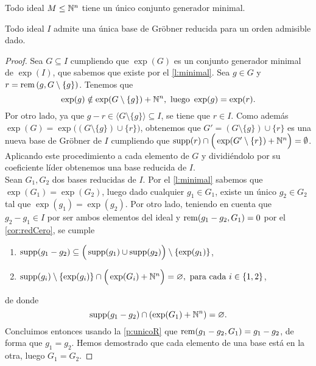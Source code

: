 \begin{lema}\label{l:minimal}
    Todo ideal $M\le \mathbb{N}^n$ tiene un único conjunto generador minimal.
\end{lema}




\begin{teorema}\label{t:reduce}
    Todo ideal $I$ admite una única base de Gröbner reducida para un orden admisible dado.
\end{teorema}
\begin{proof}
     Sea $G\subseteq I$ cumpliendo que $\exp(G)$ es un conjunto generador minimal de $\exp(I)$, que sabemos que existe por el \autoref{l:minimal}. Sea $g\in G$ y $r = \operatorname{rem}\left(g, G\setminus \{g\}\right)$. Tenemos que
    \begin{equation*}
        \exp(g) \notin \exp(G\setminus\{g\}) + \mathbb{N}^n, \text{ luego } \exp(g)=\exp(r).
    \end{equation*}
    Por otro lado, ya que $g-r\in \langle G\setminus \{g\}\rangle \subseteq I$, se tiene que $r\in I$. Como además $\exp(G) = \exp\Big( (G\setminus \{g\})\cup \{r\}\Big)$, obtenemos que $G' = (G\setminus \{g\}) \cup \{r\}$ es una nueva base de Gröbner de $I$ cumpliendo que $\operatorname{supp}(r) \cap \Big(\exp(G'\setminus\{r\}) + \mathbb{N}^n \Big) = \emptyset$.
    Aplicando este procedimiento a cada elemento de $G$ y dividiéndolo por su coeficiente líder obtenemos una base reducida de $I$.\\[5pt]
     Sean $G_1,G_2$ dos bases reducidas de $I$. Por el \autoref{l:minimal} sabemos que $\exp(G_1) = \exp(G_2)$, luego dado cualquier $g_1\in G_1$, existe un único $g_2\in G_2$ tal que $\exp(g_1) = \exp(g_2)$. Por otro lado, teniendo en cuenta que $g_2-g_1\in I$ por ser ambos elementos del ideal y $\operatorname{rem}(g_1-g_2, G_1) = 0$ por el \autoref{cor:redCero}, se cumple
    \begin{enumerate}
        \item $ \operatorname{supp}(g_1-g_2) \subseteq \Big( \operatorname{supp}(g_1)\cup \operatorname{supp}(g_2) \Big) \setminus \{\exp(g_1)\}$,
        \item $\operatorname{supp}(g_i)\setminus \{\exp(g_i)\}\cap \Big(\exp(G_i) + \mathbb{N}^n\Big) = \varnothing,\text{ para cada } i\in\{1,2\}$,
    \end{enumerate}
    de donde
    \begin{equation*}
        \operatorname{supp}(g_1-g_2) \cap \left(\exp(G_1)+\mathbb{N}^n\right) = \varnothing.
    \end{equation*}
    Concluimos entonces usando la \autoref{p:unicoR} que $\operatorname{rem}(g_1-g_2, G_1) = g_1-g_2$, de forma que $g_1=g_2$. Hemos demostrado que cada elemento de una base está en la otra, luego $G_1 = G_2$.
\end{proof}

